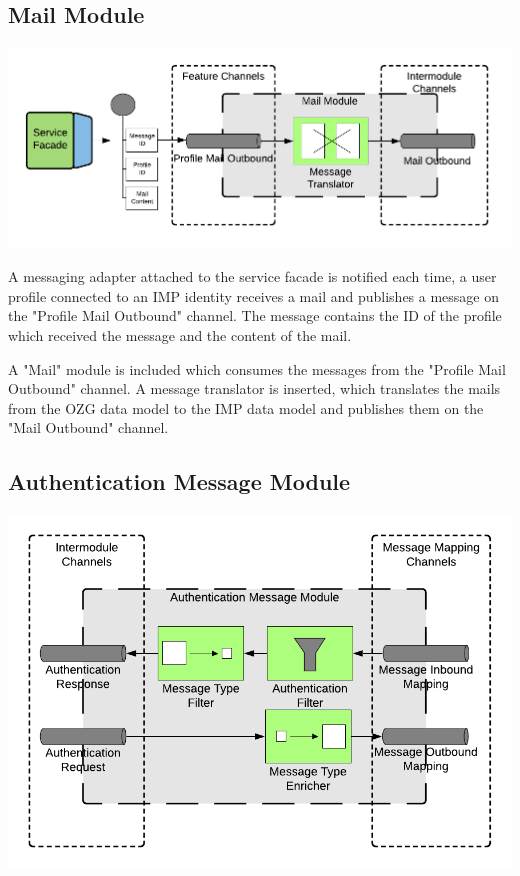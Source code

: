 \subsection{Mail Module}

\begin{center}
    \includegraphics[scale=0.6]{Diagrams/Integration Architecture 1/Technological Integration/15. Mail Module.pdf}
\end{center}

A messaging adapter attached to the service facade is notified each time, a user profile connected to an IMP identity receives a mail and publishes a message on the "Profile Mail Outbound" channel. The message contains the ID of the profile which received the message and the content of the mail.

A "Mail" module is included which consumes the messages from the "Profile Mail Outbound" channel. A message translator is inserted, which translates the mails from the OZG data model to the IMP data model and publishes them on the "Mail Outbound" channel.

\subsection{Authentication Message Module}

\begin{center}
    \includegraphics[scale=0.6]{Diagrams/Integration Architecture 1/Technological Integration/16. Authenticatin Message Module.pdf}
\end{center}

